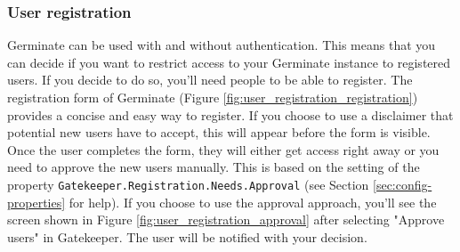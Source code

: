 \subsubsection{User registration}
\label{sec:registration}

Germinate can be used with and without authentication. This means that you can decide if you want to restrict access to your Germinate instance to registered users. If you decide to do so, you'll need people to be able to register. The registration form of Germinate (Figure \ref{fig:user_registration_registration}) provides a concise and easy way to register. If you choose to use a disclaimer that potential new users have to accept, this will appear before the form is visible. Once the user completes the form, they will either get access right away or you need to approve the new users manually. This is based on the setting of the property \texttt{Gatekeeper.Registration.Needs.Approval} (see Section \ref{sec:config-properties} for help). If you choose to use the approval approach, you'll see the screen shown in Figure \ref{fig:user_registration_approval} after selecting "Approve users" in Gatekeeper. The user will be notified with your decision.

